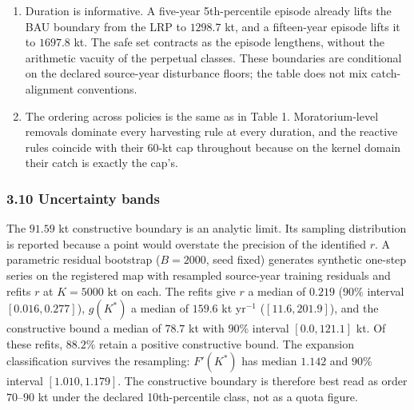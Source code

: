 \documentclass[11pt]{article}
\begin{document}
\begin{enumerate}
\def\labelenumi{(\roman{enumi})}
\item
  Duration is informative. A five-year 5th-percentile episode already
  lifts the BAU boundary from the LRP to \(1298.7\) kt, and a
  fifteen-year episode lifts it to \(1697.8\) kt. The safe set contracts
  as the episode lengthens, without the arithmetic vacuity of the
  perpetual classes. These boundaries are conditional on the declared source-year
  disturbance floors; the table does not mix catch-alignment conventions.
\item
  The ordering across policies is the same as in Table 1.
  Moratorium-level removals dominate every harvesting rule at every
  duration, and the reactive rules coincide with their 60-kt cap
  throughout because on the kernel domain their catch is exactly the
  cap's.
\end{enumerate}

\subsubsection{3.10 Uncertainty bands}\label{budget-uncertainty-bands}

The \(91.59\) kt constructive boundary is an analytic limit. Its sampling
distribution is reported because a point would overstate the precision
of the identified \(r\). A parametric residual bootstrap (\(B = 2000\),
seed fixed) generates synthetic one-step series on the registered map
with resampled source-year training residuals and refits \(r\) at
\(K = 5000\) kt on each. The refits give \(r\) a median of \(0.219\)
(\(90\%\) interval \([0.016, 0.277]\)), \(g(K^*)\) a median of \(159.6\)
kt yr\(^{-1}\) (\([11.6, 201.9]\)), and the constructive bound a median
of \(78.7\) kt with \(90\%\) interval \([0.0, 121.1]\) kt. Of these
refits, \(88.2\%\) retain a positive constructive bound. The expansion
classification survives the resampling: \(F'(K^*)\) has median \(1.142\)
and \(90\%\) interval \([1.010, 1.179]\). The constructive boundary is
therefore best read as order \(70\)--\(90\) kt under the declared
10th-percentile class, not as a quota figure.
\end{document}
